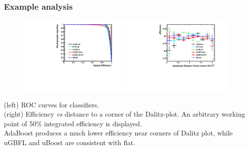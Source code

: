 \documentclass{beamer}
\begin{document}
\begin{frame}[t]
    \frametitle{Example analysis}
    \begin{figure}[] 
        \centering 
        \includegraphics[width=0.49\textwidth]{../paperdraft/graphs2/ROC_DP.pdf}
        \includegraphics[width=0.49\textwidth]{../paperdraft/graphs2/DP_compare.pdf}
        \\
    \end{figure}

    (left) ROC curves for classifiers. \\
    (right) Efficiency {\em vs} distance to a corner of the Dalitz-plot.  An arbitrary working point of 50\% integrated efficiency is displayed. 
    \bigskip \\
    AdaBoost produces a much lower efficiency near corners of Dalitz plot, while uGBFL and uBoost are consistent with flat.
\end{frame}
\end{document}
